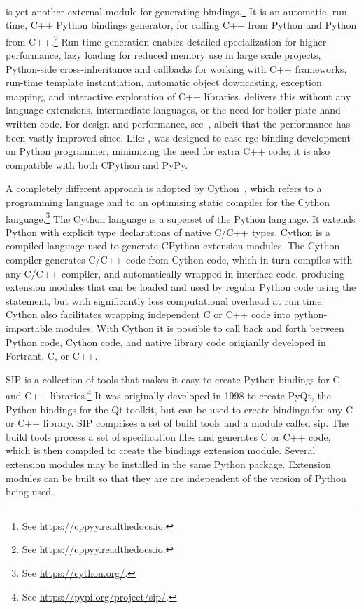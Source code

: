  is yet another external module for generating
bindings.\footnote{See \url{https://cppyy.readthedocs.io}.} It is an
automatic, run-time, C++ Python bindings generator, for calling C++
from Python and Python from
C++.\footnote{See \url{https://cppyy.readthedocs.io}.} Run-time
generation enables detailed specialization for higher performance,
lazy loading for reduced memory use in large scale projects,
Python-side cross-inheritance and callbacks for working with C++
frameworks, run-time template instantiation, automatic object
downcasting, exception mapping, and interactive exploration of C++
libraries.  delivers this without any language
extensions, intermediate languages, or the need for boiler-plate
hand-written code. For design and performance, see~\cite{ld-hppcn-16},
albeit that the  performance has been vastly
improved since.  Like ,  was
designed to ease rge binding development on Python programmer,
minimizing the need for extra C++ code; it is also compatible with
both CPython and PyPy.

A completely different approach is adopted by
Cython~\cite{bbcds-cbbw-11}, which refers to a programming language
and to an optimising static compiler for the Cython
language.\footnote{See \url{https://cython.org/}.}  The Cython
language is a superset of the Python language. It extends Python with
explicit type declarations of native C/C++ types.  Cython is a
compiled language used to generate CPython extension modules.  The
Cython compiler generates C/C++ code from Cython code, which in turn
compiles with any C/C++ compiler, and automatically wrapped in
interface code, producing extension modules that can be loaded and
used by regular Python code using the  statement,
but with significantly less computational overhead at run time. Cython
also facilitates wrapping independent C or C++ code into
python-importable modules.  With Cython it is possible to call back
and forth between Python code, Cython code, and native library code
origianlly developed in Fortrant, C, or C++.

SIP is a collection of tools that makes it easy to create Python
bindings for C and C++ libraries.\footnote{See
  \url{https://pypi.org/project/sip/}.}  It was originally developed
in 1998 to create PyQt, the Python bindings for the Qt toolkit, but
can be used to create bindings for any C or C++ library. SIP comprises
a set of build tools and a module called sip. The build tools process
a set of specification files and generates C or C++ code, which is then
compiled to create the bindings extension module. Several extension
modules may be installed in the same Python package. Extension modules
can be built so that they are are independent of the version of Python
being used.

